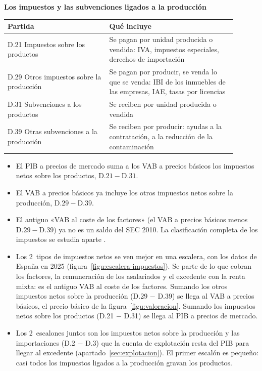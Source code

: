 \documentclass[11pt]{article}
\begin{document}
\begin{anotaciones}
\textbf{Los impuestos y las subvenciones ligados a la producción}
\begin{tablacaja}
\caption{Impuestos y subvenciones sobre la producción y las importaciones en el SEC 2010}\label{tab:impuestos-sec}
\small
\begin{tabular}{>{\raggedright\arraybackslash}m{0.4\linewidth}>{\raggedright\arraybackslash}m{0.5\linewidth}}
\toprule
\rowcolor{tceeazulpalido}
\textbf{Partida} & \textbf{Qué incluye} \\
\midrule
D.21 Impuestos sobre los productos & Se pagan por unidad producida o vendida: IVA, impuestos especiales, derechos de importación \\
D.29 Otros impuestos sobre la producción & Se pagan por producir, se venda lo que se venda: IBI de los inmuebles de las empresas, IAE, tasas por licencias \\
D.31 Subvenciones a los productos & Se reciben por unidad producida o vendida \\
D.39 Otras subvenciones a la producción & Se reciben por producir: ayudas a la contratación, a la reducción de la contaminación \\
\bottomrule
\end{tabular}
\end{tablacaja}
\begin{itemize}
\item El PIB a precios de mercado suma a los VAB a precios básicos los impuestos netos sobre los productos, $\mathrm{D.21}-\mathrm{D.31}$.
\item El VAB a precios básicos ya incluye los otros impuestos netos sobre la producción, $\mathrm{D.29}-\mathrm{D.39}$.
\item El antiguo «VAB al coste de los factores» (el VAB a precios básicos menos $\mathrm{D.29}-\mathrm{D.39}$) ya no es un saldo del SEC 2010. La clasificación completa de los impuestos se estudia aparte .
\end{itemize}
\end{anotaciones}

\begin{itemize}
\item Los 2~tipos de impuestos netos se ven mejor en una escalera, con los datos de España en 2025 (figura~\ref{figu:escalera-impuestos}). Se parte de lo que cobran los factores, la remuneración de los asalariados y el excedente con la renta mixta: es el antiguo VAB al coste de los factores. Sumando los otros impuestos netos sobre la producción (D.29 $-$ D.39) se llega al VAB a precios básicos, el precio básico de la figura~\ref{figu:valoracion}. Sumando los impuestos netos sobre los productos (D.21 $-$ D.31) se llega al PIB a precios de mercado\nocite{Eurostat2026nama10gdp}.
\item Los 2~escalones juntos son los impuestos netos sobre la producción y las importaciones (D.2 $-$ D.3) que la cuenta de explotación resta del PIB para llegar al excedente (apartado~\ref{sec:explotacion}). El primer escalón es pequeño: casi todos los impuestos ligados a la producción gravan los productos.
\end{itemize}
\end{document}
